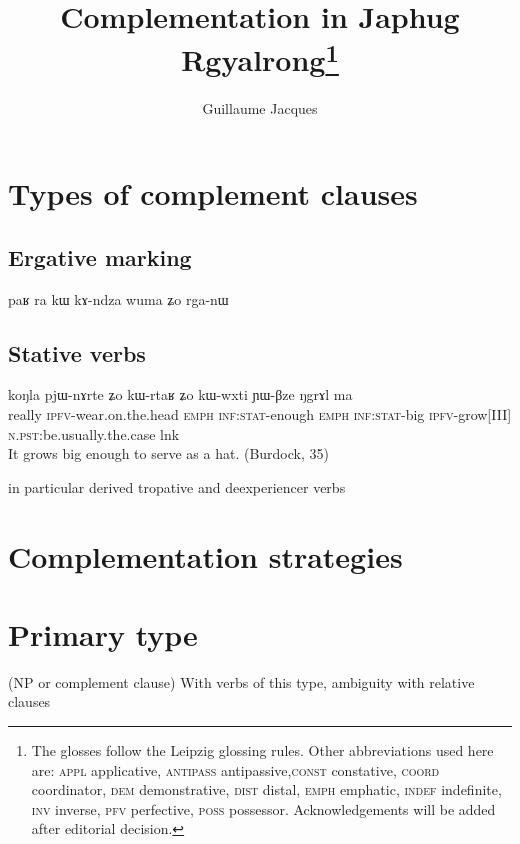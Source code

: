 \documentclass[oldfontcommands,oneside,a4paper,11pt]{article}
\newcommand{\ipa}[1]{{\phon #1}} %
\begin{document}
 

\title{Complementation in Japhug Rgyalrong\footnote{
The glosses follow the Leipzig glossing rules. Other abbreviations used here are: \textsc{appl} applicative, \textsc{antipass} antipassive,\textsc{const} constative, \textsc{coord} coordinator, \textsc{dem} demonstrative, \textsc{dist} distal, \textsc{emph} emphatic, \textsc{indef} indefinite, \textsc{inv} inverse,  \textsc{pfv} perfective, \textsc{poss} possessor. %
Acknowledgements will be added after editorial decision.  
} }
\author{Guillaume Jacques}
\maketitle
\linenumbers
 
 \citet[9]{dixon06complementation}
 
\section{Types of complement clauses} 


\subsection{Ergative marking}
paʁ ra kɯ kɤ-ndza wuma ʑo rga-nɯ
 \subsection{Stative verbs}
 
 \begin{exe}
\ex \label{ex:pjWnArte}
\gll
 \ipa{koŋla} 	\ipa{pjɯ-nɤrte} 	\ipa{ʑo} 	\ipa{kɯ-rtaʁ} 	\ipa{ʑo} 	\ipa{kɯ-wxti} 	\ipa{ɲɯ-βze} 	\ipa{ŋgrɤl} 	\ipa{ma} \\
 really \textsc{ipfv}-wear.on.the.head \textsc{emph} \textsc{inf:stat}-enough \textsc{emph}  \textsc{inf:stat}-big \textsc{ipfv}-grow[III] \textsc{n.pst}:be.usually.the.case lnk \\
 \glt It grows big enough to serve as a hat. (Burdock, 35)

\end{exe}


in particular derived tropative and deexperiencer verbs

 \section{Complementation strategies} 
\section{Primary type} 
(NP or complement clause)
 With verbs of this type, ambiguity with relative clauses
\end{document}
